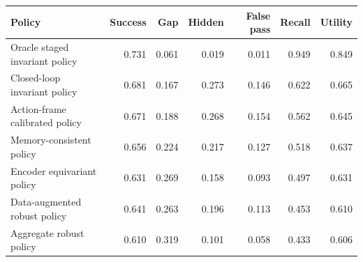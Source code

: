 \begin{tabular}{lrrrrrr}
\toprule
Policy & Success & Gap & Hidden & False pass & Recall & Utility \\
\midrule
Oracle staged invariant policy & 0.731 & 0.061 & 0.019 & 0.011 & 0.949 & 0.849 \\
Closed-loop invariant policy & 0.681 & 0.167 & 0.273 & 0.146 & 0.622 & 0.665 \\
Action-frame calibrated policy & 0.671 & 0.188 & 0.268 & 0.154 & 0.562 & 0.645 \\
Memory-consistent policy & 0.656 & 0.224 & 0.217 & 0.127 & 0.518 & 0.637 \\
Encoder equivariant policy & 0.631 & 0.269 & 0.158 & 0.093 & 0.497 & 0.631 \\
Data-augmented robust policy & 0.641 & 0.263 & 0.196 & 0.113 & 0.453 & 0.610 \\
Aggregate robust policy & 0.610 & 0.319 & 0.101 & 0.058 & 0.433 & 0.606 \\
\bottomrule
\end{tabular}
